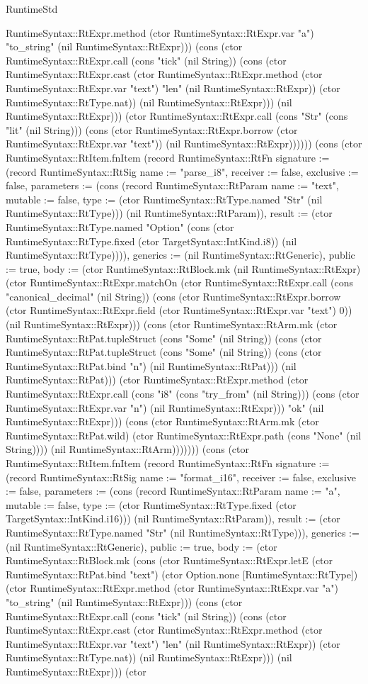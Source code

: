 \begin{lexlean}{RuntimeStd}
\begin{semanticmodule}
{RuntimeSyntax::RtExpr.method (ctor RuntimeSyntax::RtExpr.var "a") "to_string" (nil RuntimeSyntax::RtExpr))) (cons (ctor RuntimeSyntax::RtExpr.call (cons "tick" (nil String)) (cons (ctor RuntimeSyntax::RtExpr.cast (ctor RuntimeSyntax::RtExpr.method (ctor RuntimeSyntax::RtExpr.var "text") "len" (nil RuntimeSyntax::RtExpr)) (ctor RuntimeSyntax::RtType.nat)) (nil RuntimeSyntax::RtExpr))) (nil RuntimeSyntax::RtExpr))) (ctor RuntimeSyntax::RtExpr.call (cons "Str" (cons "lit" (nil String))) (cons (ctor RuntimeSyntax::RtExpr.borrow (ctor RuntimeSyntax::RtExpr.var "text")) (nil RuntimeSyntax::RtExpr))))})) (cons (ctor RuntimeSyntax::RtItem.fnItem (record RuntimeSyntax::RtFn {signature := (record RuntimeSyntax::RtSig {name := "parse_i8", receiver := false, exclusive := false, parameters := (cons (record RuntimeSyntax::RtParam {name := "text", mutable := false, type := (ctor RuntimeSyntax::RtType.named "Str" (nil RuntimeSyntax::RtType))}) (nil RuntimeSyntax::RtParam)), result := (ctor RuntimeSyntax::RtType.named "Option" (cons (ctor RuntimeSyntax::RtType.fixed (ctor TargetSyntax::IntKind.i8)) (nil RuntimeSyntax::RtType)))}), generics := (nil RuntimeSyntax::RtGeneric), public := true, body := (ctor RuntimeSyntax::RtBlock.mk (nil RuntimeSyntax::RtExpr) (ctor RuntimeSyntax::RtExpr.matchOn (ctor RuntimeSyntax::RtExpr.call (cons "canonical_decimal" (nil String)) (cons (ctor RuntimeSyntax::RtExpr.borrow (ctor RuntimeSyntax::RtExpr.field (ctor RuntimeSyntax::RtExpr.var "text") 0)) (nil RuntimeSyntax::RtExpr))) (cons (ctor RuntimeSyntax::RtArm.mk (ctor RuntimeSyntax::RtPat.tupleStruct (cons "Some" (nil String)) (cons (ctor RuntimeSyntax::RtPat.tupleStruct (cons "Some" (nil String)) (cons (ctor RuntimeSyntax::RtPat.bind "n") (nil RuntimeSyntax::RtPat))) (nil RuntimeSyntax::RtPat))) (ctor RuntimeSyntax::RtExpr.method (ctor RuntimeSyntax::RtExpr.call (cons "i8" (cons "try_from" (nil String))) (cons (ctor RuntimeSyntax::RtExpr.var "n") (nil RuntimeSyntax::RtExpr))) "ok" (nil RuntimeSyntax::RtExpr))) (cons (ctor RuntimeSyntax::RtArm.mk (ctor RuntimeSyntax::RtPat.wild) (ctor RuntimeSyntax::RtExpr.path (cons "None" (nil String)))) (nil RuntimeSyntax::RtArm)))))})) (cons (ctor RuntimeSyntax::RtItem.fnItem (record RuntimeSyntax::RtFn {signature := (record RuntimeSyntax::RtSig {name := "format_i16", receiver := false, exclusive := false, parameters := (cons (record RuntimeSyntax::RtParam {name := "a", mutable := false, type := (ctor RuntimeSyntax::RtType.fixed (ctor TargetSyntax::IntKind.i16))}) (nil RuntimeSyntax::RtParam)), result := (ctor RuntimeSyntax::RtType.named "Str" (nil RuntimeSyntax::RtType))}), generics := (nil RuntimeSyntax::RtGeneric), public := true, body := (ctor RuntimeSyntax::RtBlock.mk (cons (ctor RuntimeSyntax::RtExpr.letE (ctor RuntimeSyntax::RtPat.bind "text") (ctor Option.none [RuntimeSyntax::RtType]) (ctor RuntimeSyntax::RtExpr.method (ctor RuntimeSyntax::RtExpr.var "a") "to_string" (nil RuntimeSyntax::RtExpr))) (cons (ctor RuntimeSyntax::RtExpr.call (cons "tick" (nil String)) (cons (ctor RuntimeSyntax::RtExpr.cast (ctor RuntimeSyntax::RtExpr.method (ctor RuntimeSyntax::RtExpr.var "text") "len" (nil RuntimeSyntax::RtExpr)) (ctor RuntimeSyntax::RtType.nat)) (nil RuntimeSyntax::RtExpr))) (nil RuntimeSyntax::RtExpr))) (ctor }
\end{semanticmodule}
\end{lexlean}
